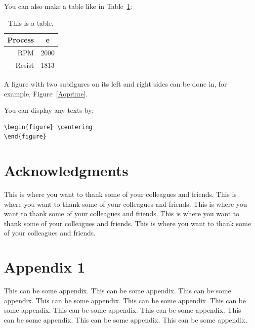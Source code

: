 \documentclass[12pt]{article}
\numberwithin{equation}{section}
\numberwithin{table}{section}
\numberwithin{figure}{section}
\begin{document}
You can also make a table like in Table~\ref{table1}:

\begin{table} \centering
  \begin{tabular}{r|c}
    \hline
    Process & e \\
    \hline
       RPM & 2000 \\
       Resist & 1813 \\
    \hline
  \end{tabular}
  \caption{This is a table.}
  \label{table1}
\end{table}

A figure with two subfigures on its left and right sides can be done in, for example, 
Figure~\ref{Aoprime}.

You can display any texts by:
\begin{verbatim}
\begin{figure} \centering
\end{figure}
\end{verbatim}

\section*{Acknowledgments}

This is where you want to thank some of your colleagues and friends. This is where you want to thank some of your colleagues and friends. This is where you want to thank some of your colleagues and friends. This is where you want to thank some of your colleagues and friends. This is where you want to thank some of your colleagues and friends. 
 
\appendix

\section{Appendix 1} 
\label{appendix_1}

This can be some appendix. This can be some appendix. This can be some appendix. This can be some appendix. This can be some appendix. This can be some appendix. This can be some appendix. This can be some appendix. This can be some appendix. This can be some appendix. This can be some appendix. 



\end{document}
